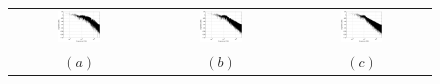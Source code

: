\documentclass{article}
\begin{document}

\begin{figure}[!ht] \centering
  \begin{tabular}{ccc}
    \includegraphics[width=0.33\textwidth]{spectrum_RMS0040.eps} &
    \includegraphics[width=0.33\textwidth]{spectrum_RMS0200.eps} &
    \includegraphics[width=0.33\textwidth]{spectrum_RMS1000.eps} \\
    $(a)$ & $(b)$ & $(c)$ \\
  \end{tabular}
\end{figure}
\end{document}
